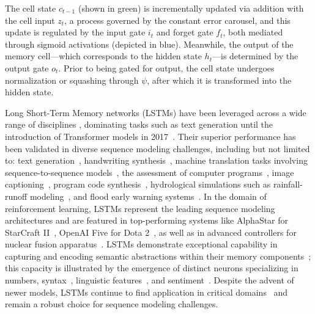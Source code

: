 The cell state $c_{t-1}$ (shown in green) is incrementally updated via addition with the cell input $z_t$, a process governed by the constant error carousel, and this update is regulated by the input gate $i_t$ and forget gate $f_t$, both mediated through sigmoid activations (depicted in blue). Meanwhile, the output of the memory cell—which corresponds to the hidden state $h_t$—is determined by the output gate $o_t$. Prior to being gated for output, the cell state undergoes normalization or squashing through $\psi$, after which it is transformed into the hidden state.

Long Short-Term Memory networks (LSTMs) have been leveraged across a wide range of disciplines \citep{Hochreiter:01,Hochreiter:07,Schmidhuber:15}, dominating tasks such as text generation until the introduction of Transformer models in 2017~\citep{Vaswani:17}. Their superior performance has been validated in diverse sequence modeling challenges, including but not limited to: text generation~\citep{Graves:13,Karpathy:15blog}, handwriting synthesis~\citep{Graves:13}, machine translation tasks involving sequence-to-sequence models~\citep{Sutskever:14nips}, the assessment of computer programs~\citep{Zaremba:14arxiv}, image captioning~\citep{Karpathy:15,Hossain:19}, program code synthesis~\citep{Karpathy:15blog}, hydrological simulations such as rainfall-runoff modeling~\citep{Kratzert:18,Kratzert:19}, and flood early warning systems~\citep{Nearing:24}. In the domain of reinforcement learning, LSTMs represent the leading sequence modeling architectures and are featured in top-performing systems like AlphaStar for StarCraft II~\citep{Vinyals:17short}, OpenAI Five for Dota 2~\citep{OpenAI:19}, as well as in advanced controllers for nuclear fusion apparatus~\citep{Degrave:22short}. LSTMs demonstrate exceptional capability in capturing and encoding semantic abstractions within their memory components~\citep{Karpathy:15blog}; this capacity is illustrated by the emergence of distinct neurons specializing in numbers, syntax~\citep{Lakretz:19}, linguistic features~\citep{Bau:19}, and sentiment~\citep{Radford:17arxiv}. Despite the advent of newer models, LSTMs continue to find application in critical domains~\citep{Degrave:22short,Nearing:24} and remain a robust choice for sequence modeling challenges.

